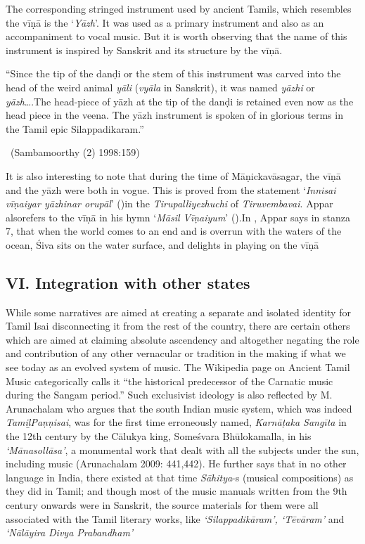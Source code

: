 The corresponding stringed instrument used by ancient Tamils, which resembles the vīṇā is the ‘\textit{Yāzh}’. It was used as a primary instrument and also as an accompaniment to vocal music. But it is worth observing that the name of this instrument is inspired by Sanskrit and its structure by the vīṇā.

\begin{myquote}
“Since the tip of the danḍi or the stem of this instrument was carved into the head of the weird animal \textit{yāli} (\textit{vyāla} in Sanskrit), it was named \textit{yāzhi} or \textit{yāzh}….The head-piece of yāzh at the tip of the danḍi is retained even now as the head piece in the veena. The yāzh instrument is spoken of in glorious terms in the Tamil epic Silappadikaram.”

~\hfill (Sambamoorthy (2) 1998:159)
\end{myquote}

It is also interesting to note that during the time of Māṇickavāsagar, the vīṇā and the yāzh were both in vogue. This is proved from the statement ‘\textit{Innisai vīṇaiyar yāzhinar orupāl}’ ()in the \textit{Tirupalliyezhuchi} of \textit{Tiruvembavai}. Appar also\break refers to the vīṇā in his hymn ‘\textit{Māsil Vīṇaiyum}’ ().In , Appar says in stanza 7, that when the world comes to an end and is overrun with the waters of the ocean, Śiva sits on the water surface, and delights in playing on the vīṇā 


\subsection*{VI. Integration with other states}

While some narratives are aimed at creating a separate and isolated identity for Tamil Isai disconnecting it from the rest of the country, there are certain others which are aimed at claiming absolute ascendency and altogether negating the role and contribution of any other vernacular or tradition in the making if what we see today as an evolved system of music. The Wikipedia page on Ancient Tamil Music categorically calls it “the historical predecessor of the Carnatic music during the Sangam period.” Such exclusivist ideology is also reflected by M. Arunachalam who argues that the south Indian music system, which was indeed \textit{TamiḻPaṇṇisai}, was for the first time erroneously named, \textit{Karnāṭaka Sangīta} in the 12th century by the Cālukya king, Someśvara Bhūlokamalla, in his \textit{‘Mānasollāsa’}, a monumental work that dealt with all the subjects under the sun, including music (Arunachalam 2009: 441,442). He further says that in no other language in India, there existed at that time \textit{Sāhitya}-s (musical compositions) as they did in Tamil; and though most of the music manuals written from the 9th century onwards were in Sanskrit, the source materials for them were all associated with the Tamil literary works, like \textit{‘Silappadikāram’, ‘Tēvāram’} and \textit{‘Nālāyira Divya Prabandham’}

